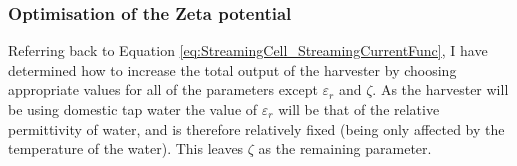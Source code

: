 \subsubsection{Optimisation of the Zeta potential}

Referring back to Equation \ref{eq:StreamingCell_StreamingCurrentFunc}, I have
determined how to increase the total output of the harvester by choosing
appropriate values for all of the parameters except $\varepsilon_{r}$ and
$\zeta$. As the harvester will be using domestic tap water the value of
$\varepsilon_{r}$ will be that of the relative permittivity of water, and is
therefore relatively fixed (being only affected by the temperature of the
water). This leaves $\zeta$ as the remaining parameter.

